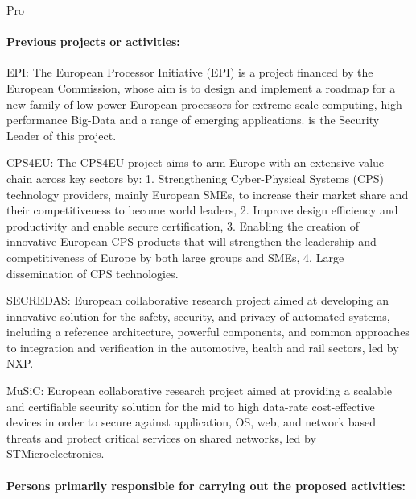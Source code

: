 \begin{sitedescription}{Pro}
\paragraph*{Previous projects or activities:}

\begin{compactitem}
\item EPI: The European Processor Initiative (EPI) is a project
  financed by the European Commission, whose aim is to design and
  implement a roadmap for a new family of low-power European
  processors for extreme scale computing, high-performance Big-Data
  and a range of emerging applications. \provenrun{} is the Security
  Leader of this project.
\item CPS4EU: The CPS4EU project aims to arm Europe with an extensive
  value chain across key sectors by: 1. Strengthening Cyber-Physical
  Systems (CPS) technology providers, mainly European SMEs, to
  increase their market share and their competitiveness to become
  world leaders, 2. Improve design efficiency and productivity and
  enable secure certification, 3. Enabling the creation of innovative
  European CPS products that will strengthen the leadership and
  competitiveness of Europe by both large groups and SMEs, 4. Large
  dissemination of CPS technologies.
\item SECREDAS: European collaborative research project aimed at
  developing an innovative solution for the safety, security, and
  privacy of automated systems, including a reference architecture,
  powerful components, and common approaches to integration and
  verification in the automotive, health and rail sectors, led by
  NXP.
\item MuSiC: European collaborative research project aimed at
  providing a scalable and certifiable security solution for the mid
  to high data-rate cost-effective devices in order to secure against
  application, OS, web, and network based threats and protect critical
  services on shared networks, led by STMicroelectronics.
\end{compactitem}


\paragraph*{Persons primarily responsible for carrying out the proposed activities:}


\end{sitedescription}
